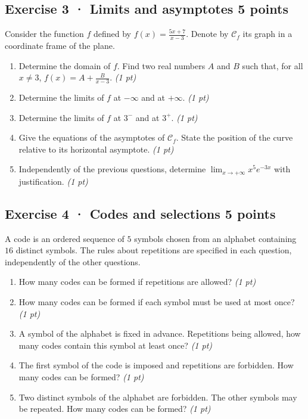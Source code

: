 \subsection*{Exercise 3 · Limits and asymptotes \hfill 5 points}Consider the function $f$ defined by $f(x)=\frac{5x+7}{x-3}$. Denote by $\mathcal C_f$ its graph in a coordinate frame of the plane.

\begin{enumerate}

\item Determine the domain of $f$. Find two real numbers $A$ and $B$ such that, for all $x\ne3$, $f(x)=A+\frac B{x-3}$. \hfill\textit{(1 pt)}

\item Determine the limits of $f$ at $-\infty$ and at $+\infty$. \hfill\textit{(1 pt)}

\item Determine the limits of $f$ at $3^-$ and at $3^+$. \hfill\textit{(1 pt)}

\item Give the equations of the asymptotes of $\mathcal C_f$. State the position of the curve relative to its horizontal asymptote. \hfill\textit{(1 pt)}

\item Independently of the previous questions, determine $\displaystyle\lim_{x\to+\infty}x^{5}e^{-3x}$ with justification. \hfill\textit{(1 pt)}

\end{enumerate}

\subsection*{Exercise 4 · Codes and selections \hfill 5 points}A code is an ordered sequence of $5$ symbols chosen from an alphabet containing $16$ distinct symbols. The rules about repetitions are specified in each question, independently of the other questions.

\begin{enumerate}

\item How many codes can be formed if repetitions are allowed? \hfill\textit{(1 pt)}

\item How many codes can be formed if each symbol must be used at most once? \hfill\textit{(1 pt)}

\item A symbol of the alphabet is fixed in advance. Repetitions being allowed, how many codes contain this symbol at least once? \hfill\textit{(1 pt)}

\item The first symbol of the code is imposed and repetitions are forbidden. How many codes can be formed? \hfill\textit{(1 pt)}

\item Two distinct symbols of the alphabet are forbidden. The other symbols may be repeated. How many codes can be formed? \hfill\textit{(1 pt)}

\end{enumerate}

